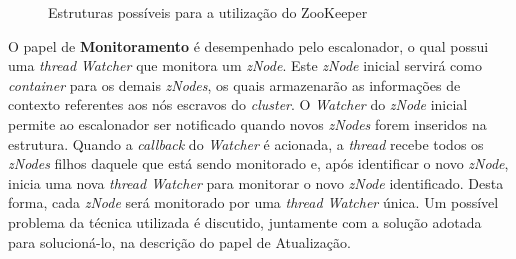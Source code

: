 
\begin{figure}[!hbt]

\center
{}
\qquad
{} %

\caption{Estruturas possíveis para a utilização do ZooKeeper}
\label{fig:zk}
\end{figure}



O papel de \textbf{Monitoramento} é desempenhado pelo escalonador, o qual possui uma \textit{thread} \textit{Watcher} que monitora um \textit{zNode}. Este \textit{zNode} inicial servirá como \textit{container} para os demais \textit{zNodes}, os quais armazenarão as informações de contexto referentes aos nós escravos do \textit{cluster}. O \textit{Watcher} do \textit{zNode} inicial permite ao escalonador ser notificado quando novos \textit{zNodes} forem inseridos na estrutura. Quando a \textit{callback} do \textit{Watcher} é acionada, a \textit{thread} recebe todos os \textit{zNodes} filhos daquele que está sendo monitorado e, após identificar o novo \textit{zNode}, inicia uma nova \textit{thread Watcher} para monitorar o novo \textit{zNode} identificado. Desta forma, cada \textit{zNode} será monitorado por uma \textit{thread Watcher} única. Um possível problema da técnica utilizada é discutido, juntamente com a solução adotada para solucioná-lo, na descrição do papel de Atualização.

